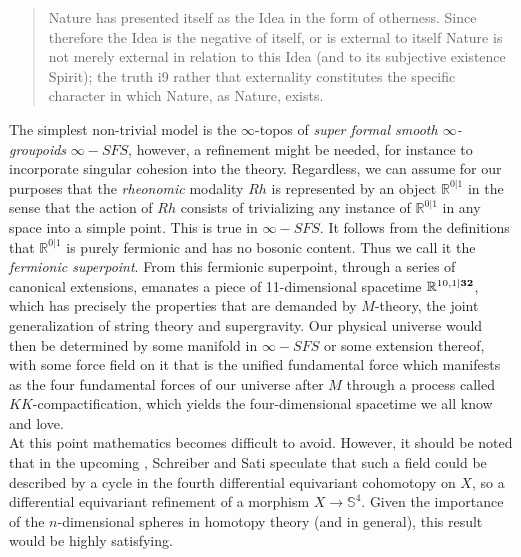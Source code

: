 \documentclass{article}
\begin{document}
\begin{quote}
    Nature has presented itself as the Idea in the form of otherness. Since therefore the Idea is the
negative of itself, or is external to itself Nature is not merely external in relation to this Idea (and
to its subjective existence Spirit); the truth i9 rather that externality constitutes the specific character
in which Nature, as Nature, exists.
\end{quote}

The simplest non-trivial model is the $\infty$-topos of \emph{super formal smooth $\infty$-groupoids}
$\infty-SFS$, however, a refinement might be needed, for instance to incorporate singular cohesion into
the theory. Regardless, we can assume for our purposes that the \emph{rheonomic} modality $Rh$ is represented
by an object $\mathbb{R}^{0|1}$ in the sense that the action of $Rh$ consists of trivializing any instance
of  $\mathbb{R}^{0|1}$ in any space into a simple point. This is true in $\infty-SFS$. It follows from
the definitions that $\mathbb{R}^{0|1}$ is purely fermionic and has no bosonic content. Thus we call it
the \emph{fermionic superpoint}. From this fermionic superpoint, through a series of canonical extensions,
emanates a piece of 11-dimensional spacetime $\mathbb{R}^{10,1|\textrm{\textbf{32}}}$, which has precisely
the properties that are demanded by $M$-theory, the joint generalization of string theory and supergravity.
Our physical universe would then be determined by some manifold in $\infty-SFS$ or some extension thereof,
with some force field on it that is the unified fundamental force which manifests as the four fundamental
forces of our universe after $M$ through a process called $KK$-compactification, which yields the four-dimensional
spacetime we all know and love. \\

At this point mathematics becomes difficult to avoid. However, it should be noted that in the upcoming
\cite{SSS}, Schreiber and Sati speculate that such a field could be described by a cycle in the fourth
differential equivariant cohomotopy on $X$, so a differential equivariant refinement of a morphism $X\rightarrow
\mathbb{S}^4$. Given the importance of the $n$-dimensional spheres in homotopy theory (and in general),
this result would be highly satisfying.
\end{document}
